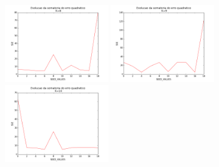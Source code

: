 \documentclass[12pt, a4paper]{article}
\begin{document}
\begin{landscape}
\begin{figure}[!ht]
    \includegraphics[width=0.4\textwidth]{erro_k8.png}    
    \includegraphics[width=0.4\textwidth]{erro_k9.png}
    \includegraphics[width=0.4\textwidth]{erro_k10.png}
\end{figure}
\end{landscape}
\end{document}
